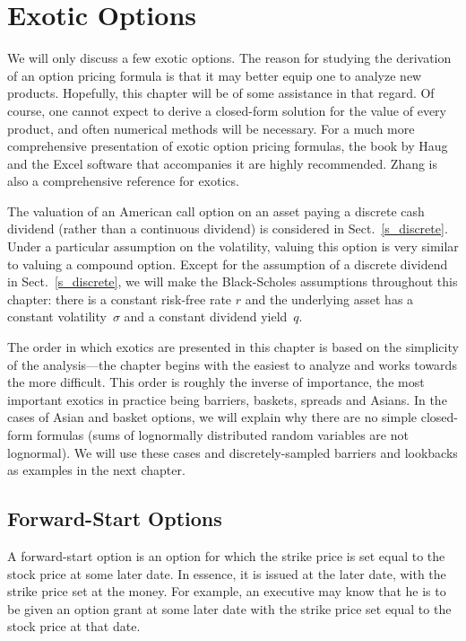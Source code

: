 \chapter{Exotic Options}\label{c_exotics}

We will only discuss a few exotic options.  The reason for studying the derivation of an option pricing formula is that it may better equip one to analyze new products.  Hopefully, this chapter will be of some assistance in that regard.  Of course, one cannot expect to derive a closed-form solution for the value of every product, and often numerical methods  will be necessary.  For a much more comprehensive presentation of exotic option pricing formulas, the book by Haug \cite{Haug} and the Excel software that accompanies it are highly recommended.  Zhang \cite{Zhang} is also a comprehensive reference for exotics. 

The valuation of an American call option on an asset paying a discrete cash dividend (rather than a continuous dividend) is considered in Sect.~\ref{s_discrete}.  Under a particular assumption on the volatility, valuing this option is very similar to valuing a compound option.  Except for the assumption of a discrete dividend in Sect.~\ref{s_discrete}, we will make the Black-Scholes assumptions throughout this chapter: there is a constant risk-free rate $r$ and the underlying asset has a  constant volatility~$\sigma$ and a constant dividend yield~$q$. 

The order in which exotics are presented in this chapter is based on the simplicity of the analysis---the chapter begins with the easiest to analyze and works towards the more difficult.  This order is roughly the inverse of importance, the most important exotics in practice being barriers, baskets, spreads and Asians.  In the cases of Asian and basket options, we will explain why there are no simple closed-form formulas (sums of lognormally distributed random variables are not lognormal).  We will use these cases and discretely-sampled barriers and lookbacks as examples in the next chapter.  


\section{Forward-Start Options}
A forward-start option  is an option for which the strike price is set equal to the stock price at some later date.  In essence, it is issued at the later date, with the strike price set at the money.  For example, an executive may know that he is to be given an option grant at some later date with the strike price set equal to the stock price at that date.

